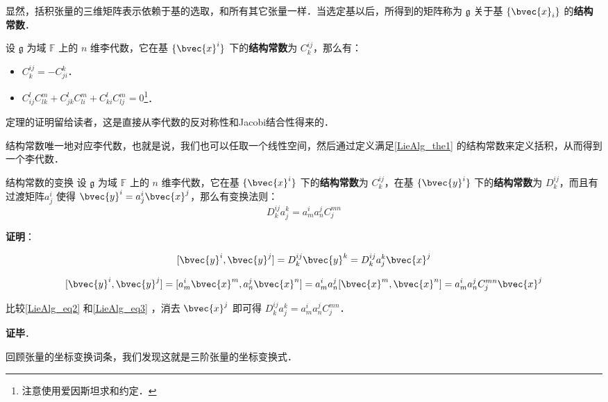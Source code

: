 显然，括积张量的三维矩阵表示依赖于基的选取，和所有其它张量一样．当选定基以后，所得到的矩阵称为 $\mathfrak{g}$ 关于基 $\{\bvec{x}_i\}$ 的\textbf{结构常数}．

\begin{theorem}{}\label{LieAlg_the1}
设 $\mathfrak{g}$ 为域 $\mathbb{F}$ 上的 $n$ 维李代数，它在基 $\{\bvec{x}^i\}$ 下的\textbf{结构常数}为 $C_k^{ij}$，那么有：
\begin{itemize}
\item $C_k^{ij}=-C^k_{ji}$．
\item $C^l_{ij}C^m_{lk}+C^l_{jk}C^m_{li}+C^l_{ki}C^m_{lj}=0$\footnote{注意使用爱因斯坦求和约定．}．
\end{itemize}
\end{theorem}

定理的证明留给读者，这是直接从李代数的反对称性和Jacobi结合性得来的．

结构常数唯一地对应李代数，也就是说，我们也可以任取一个线性空间，然后通过定义满足\autoref{LieAlg_the1} 的结构常数来定义括积，从而得到一个李代数．

\begin{theorem}{结构常数的变换}
设 $\mathfrak{g}$ 为域 $\mathbb{F}$ 上的 $n$ 维李代数，它在基 $\{\bvec{x}^i\}$ 下的\textbf{结构常数}为 $C_k^{ij}$，在基 $\{\bvec{y}^i\}$ 下的\textbf{结构常数}为 $D_k^{ij}$，而且有过渡矩阵$a^i_j$ 使得 $\bvec{y}^i=a^i_j\bvec{x}^j$，那么有变换法则：
\begin{equation}
D^{ij}_ka^k_j=a^i_ma^j_nC_j^{mn}
\end{equation}

\end{theorem}

\textbf{证明}：

\begin{equation}\label{LieAlg_eq2}
[\bvec{y}^i, \bvec{y}^j]=D^{ij}_k\bvec{y}^k=D^{ij}_ka^k_j\bvec{x}^j
\end{equation}

\begin{equation}\label{LieAlg_eq3}
[\bvec{y}^i, \bvec{y}^j]=[a^i_m\bvec{x}^m, a^j_n\bvec{x}^n]=a^i_ma^j_n[\bvec{x}^m, \bvec{x}^n]=a^i_ma^j_nC_j^{mn}\bvec{x}^j
\end{equation}

比较\autoref{LieAlg_eq2} 和\autoref{LieAlg_eq3} ，消去 $\bvec{x}^j$ 即可得 $D^{ij}_ka^k_j=a^i_ma^j_nC_j^{mn}$．

\textbf{证毕}．

回顾张量的坐标变换词条，我们发现这就是三阶张量的坐标变换式．






